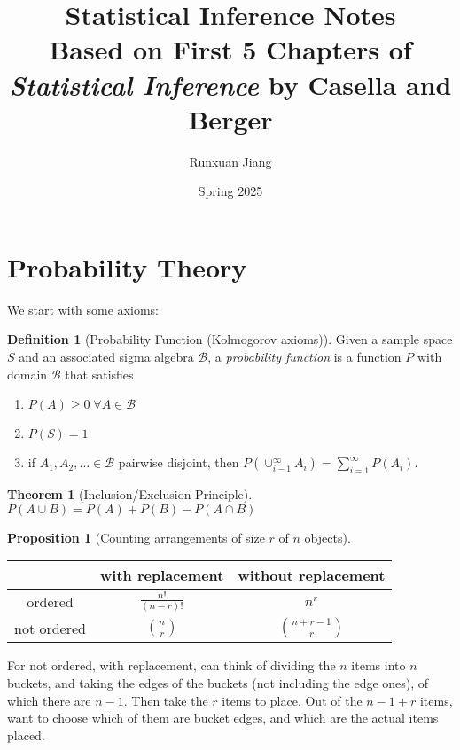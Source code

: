 \documentclass[12pt, letterpaper]{article}
\title{Statistical Inference Notes \\
[1ex] \large Based on First 5 Chapters of \textit{Statistical Inference} by Casella and Berger }
\author{Runxuan Jiang}
\date{Spring 2025}
\theoremstyle{definition}
\newtheorem*{defn}{Definition}
\newtheorem*{prop}{Proposition}
\newtheorem*{thm}{Theorem}
\theoremstyle{remark}
\begin{document}
\maketitle

\section{Probability Theory}

We start with some axioms:
\begin{defn}[Probability Function (Kolmogorov axioms)]
    Given a sample space \(S\) and an associated sigma algebra \(\mathcal{B}\), a \textit{probability function} is a function \(P\) with domain \(\mathcal{B}\) that satisfies

    \begin{enumerate}
        \item \(P(A) \geq 0 \; \forall A \in \mathcal{B}\)
        \item \(P(S) = 1\)
        \item if \(A_1, A_2, \ldots \in \mathcal{B}\) pairwise disjoint, then \(P(\cup_{i-1}^{\infty}A_i) = \sum_{i=1}^{\infty} P(A_i)\).
    \end{enumerate}

    
\end{defn}

\begin{thm}[Inclusion/Exclusion Principle]
    \(P(A \cup B) = P(A) + P(B) - P(A \cap B)\)
    
\end{thm}

\begin{prop}[Counting arrangements of size \(r\) of \(n\) objects]
    \hfill

    \begin{tabular}{ |c||c|c| }
        \hline
         & with replacement & without replacement \\
        \hline \hline
        ordered & \(\frac{n!}{(n-r)!}\) & \(n^r\) \\
        \hline
        not ordered & \(n \choose r\) & \(n+r-1 \choose r\) \\
        \hline
    \end{tabular}

    For not ordered, with replacement, can think of dividing the \(n\) items into \(n\) buckets, and taking the edges of the buckets (not including the edge ones), of which there are \(n-1\). Then take the \(r\) items to place. Out of the \(n-1+r\) items, want to choose which of them are bucket edges, and which are the actual items placed.
\end{prop}
\end{document}
